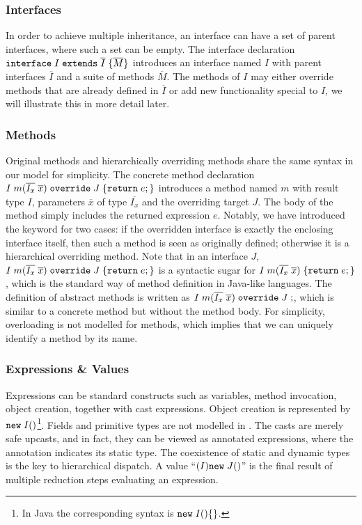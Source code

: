 \subsubsection{Interfaces}
In order to achieve multiple inheritance, an interface can have a set of 
parent interfaces, where such a set can be empty. The interface declaration $\texttt{interface} \; I \; \texttt{extends} \; \overline{I} \; {\{} \overline{M} {\}}$ introduces an interface named $I$ with parent interfaces $\overline{I}$ and a suite of methods $\overline{M}$. The methods of $I$ may either override methods that are already defined in $\overline{I}$ or add new functionality special to $I$, we will illustrate this in more detail later.

\subsubsection{Methods}
Original methods and hierarchically overriding methods share the same syntax in our model for simplicity.
The concrete method declaration $I \; m (\overline{I_x} \; \overline{x}) \; \texttt{override} \; J \; {\{} \texttt{return} \; e ; {\}}$ introduces a
method named $m$ with result type $I$, parameters $\overline{x}$ of
type $\overline{I_x}$ and the overriding target $J$. The body of the
method simply includes the returned expression $e$. Notably, we have introduced the
\kwoverride{} keyword for two cases: if the overridden interface is exactly the enclosing
interface itself, then such a method is seen as originally defined; otherwise it is a hierarchical overriding method. 
Note that in an interface $J$, $I \; m (\overline{I_x} \; \overline{x}) \; \texttt{override} \; J \; {\{} \texttt{return} \; e ; {\}} $ is a syntactic sugar for $
I \; m(\overline{I_x} \; \overline{x}) \; {\{} \texttt{return} \; e ; {\}} $, which is the standard way of method definition in Java-like languages. The definition
of abstract methods is written as $I \; m (\overline{I_x} \; \overline{x}) \; \texttt{override} \; J \; ;$, which is
similar to a concrete method but without the method body. 
For simplicity, overloading is not modelled for methods, which
implies that we can uniquely identify a method by its name.

\subsubsection{Expressions \& Values}
Expressions can be standard constructs such as variables, method
invocation, object creation, together with cast expressions. 
Object creation is represented by $\texttt{new} \; I()$\footnote{In Java the corresponding syntax is $\texttt{new} \; I()\{\}$.}. Fields and primitive types are not modelled in \MIM{}. 
The casts are merely safe upcasts, and in fact, they can be viewed as
annotated expressions, where the annotation indicates its static type.
The coexistence of static and dynamic types is the key to hierarchical dispatch.
A value
``$(I)\texttt{new} \; J()$''
is the final result of multiple reduction steps evaluating an
expression.

